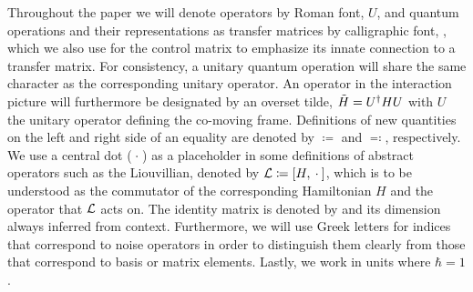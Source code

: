 Throughout the paper we will denote operators by Roman font, \eg $U$, and quantum operations and their representations as transfer matrices by calligraphic font, \eg \liouvU, which we also use for the control matrix \ctrlmat to emphasize its innate connection to a transfer matrix.
For consistency, a unitary quantum operation will share the same character as the corresponding unitary operator.
An operator in the interaction picture will furthermore be designated by an overset tilde, \eg $\tilde{H} = U^\dagger H U$ with $U$ the unitary operator defining the co-moving frame.
Definitions of new quantities on the left and right side of an equality are denoted by $\coloneqq$ and $\eqqcolon$, respectively.
We use a central dot ($\:\cdot\:$) as a placeholder in some definitions of abstract operators such as the Liouvillian, denoted by $\mc{L}\coloneqq\comm{H}{\placeholder}$, which is to be understood as the commutator of the corresponding Hamiltonian $H$ and the operator that $\mathcal{L}$ acts on.
The identity matrix is denoted by \eye and its dimension always inferred from context.
Furthermore, we will use Greek letters for indices that correspond to noise operators in order to distinguish them clearly from those that correspond to basis or matrix elements.
Lastly, we work in units where $\hbar =  1$.
